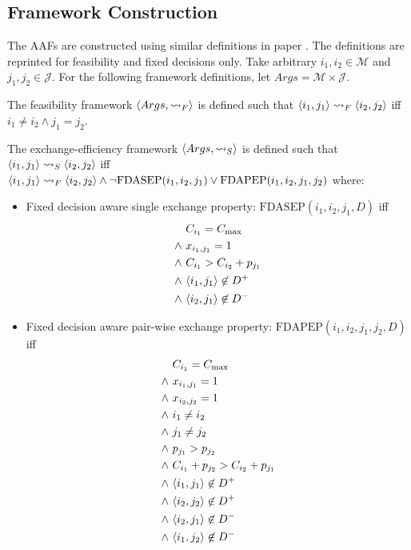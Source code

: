 \subsection{Framework Construction}

The AAFs are constructed using similar definitions in paper \cite{aes}. The definitions are reprinted for feasibility and fixed decisions only. Take arbitrary $i_1,i_2\in\mathcal{M}$ and $j_1,j_2\in\mathcal{J}$. For the following framework definitions, let $Args=\mathcal{M}\times\mathcal{J}$.

\begin{definition}
	\label{feasibilityframework}
	
	The feasibility framework $\langle{Args},{\rightsquigarrow_F}\rangle$ is defined such that $\langle{i_1},{j_1}\rangle\rightsquigarrow_F\langle{i_2},{j_2}\rangle$ iff $i_1\neq i_2\land j_1=j_2$.
\end{definition}

\begin{definition}
	\label{exchangefficiencyframework}

	The exchange-efficiency framework $\langle{Args},{\rightsquigarrow_S}\rangle$ is defined such that $\langle{i_1},{j_1}\rangle\rightsquigarrow_S\langle{ i_2},{j_2}\rangle$ iff $\langle{i_1},{j_1}\rangle\rightsquigarrow_F\langle{i_2},{j_2}\rangle\land\neg\text{FDASEP}(i_1,i_2,j_1)\lor\text{FDAPEP}(i_1,i_2,j_1,j_2)$ where:
	\begin{itemize}
		\item Fixed decision aware single exchange property: $\text{FDASEP}(i_1,i_2,j_1, D)$ iff
			\begin{align*}
				&C_{i_1}=C_{\max}\\
				\land\ &x_{i_1,j_1}=1\\
				\land\ &C_{i_1}>C_{i_2}+p_{j_1}\\
				\land\ &\langle{i_1},{j_1}\rangle\not\in D^+\\
				\land\ &\langle{i_2},{j_1}\rangle\not\in D^-
			\end{align*}
		\item Fixed decision aware pair-wise exchange property: $\text{FDAPEP}(i_1,i_2,j_1,j_2, D)$ iff
			\begin{align*}
				&C_{i_1}=C_{\max}\\
				\land\ &x_{i_1,j_1}=1\\
				\land\ &x_{i_2,j_2}=1\\
				\land\ &i_1\neq i_2\\
				\land\ &j_1\neq j_2\\
				\land\ &p_{j_1}>p_{j_2}\\
				\land\ &C_{i_1}+p_{j_2}>C_{i_2}+p_{j_1}\\
				\land\ &\langle{i_1},{j_1}\rangle\not\in D^+\\
				\land\ &\langle{i_2},{j_2}\rangle\not\in D^+\\
				\land\ &\langle{i_2},{j_1}\rangle\not\in D^-\\
				\land\ &\langle{i_1},{j_2}\rangle\not\in D^-
			\end{align*}
	\end{itemize}
\end{definition}

